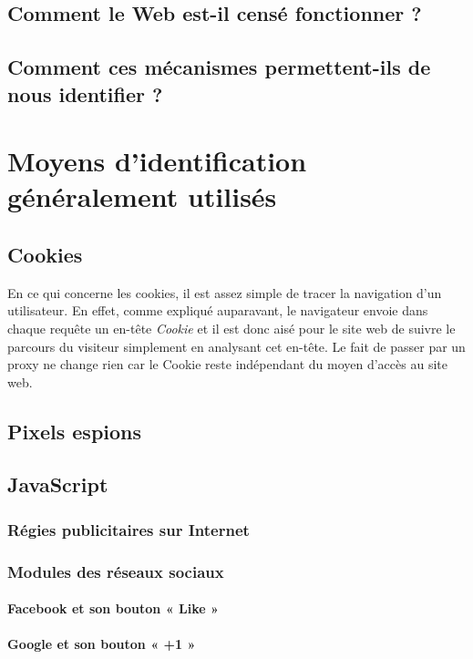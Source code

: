 \documentclass[a4paper,12pt,french]{report}
\begin{document}
\section{Comment le Web est-il censé fonctionner ?}

\section{Comment ces mécanismes permettent-ils de nous identifier ?}


\chapter{Moyens d'identification généralement utilisés}
\section{Cookies}
En ce qui concerne les cookies, il est assez simple de tracer la navigation d'un utilisateur. En effet, comme expliqué auparavant, le navigateur envoie dans chaque requête un en-tête \textit{Cookie} et il est donc aisé pour le site web de suivre le parcours du visiteur simplement en analysant cet en-tête. Le fait de passer par un proxy ne change rien car le Cookie reste indépendant du moyen d'accès au site web.
\section{Pixels espions}
\section{JavaScript}
	\subsection{Régies publicitaires sur Internet}
		
	\subsection{Modules des réseaux sociaux}
		
		\subsubsection{Facebook et son bouton « Like »}
			
		\subsubsection{Google et son bouton « +1 »}
			
\end{document}
